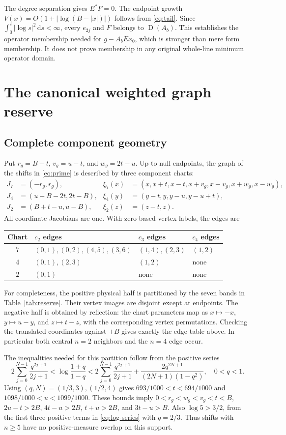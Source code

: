 \documentclass[11pt,a4paper]{article}
\newcommand{\Dom}{\operatorname{D}}
\theoremstyle{remark}
\numberwithin{equation}{section}
\begin{document}
The degree separation gives $E^*F=0$. The endpoint growth
$V(x)=O(1+|\log(B-|x|)|)$ follows from \eqref{eq:tail}. Since
$\int_0^\varepsilon|\log s|^2\,\mathrm ds<\infty$, every $e_{2j}$ and
$F$ belongs to $\Dom(A_b)$. This establishes the operator membership
needed for $g-A_bEx_0$, which is stronger than mere form membership.
It does not prove membership in any original whole-line minimum operator
domain.

\section{The canonical weighted graph reserve}\label{sec:reserve}
\subsection{Complete component geometry}
Put $r_g=B-t$, $v_g=u-t$, and $w_g=2t-u$. Up to null endpoints, the graph
of the shifts in \eqref{eq:prime} is described by three component charts:
\begin{align*}
 J_7&=(-r_g,r_g),&
 \xi_7(x)&=(x,x+t,x-t,x+v_g,x-v_g,x+w_g,x-w_g),\\
 J_4&=(u+B-2t,2t-B),&
 \xi_4(y)&=(y-t,y,y-u,y-u+t),\\
 J_2&=(B+t-u,u-B),&
 \xi_2(z)&=(z-t,z).
\end{align*}
All coordinate Jacobians are one. With zero-based vertex labels, the edges
are
\begin{center}
\small
\begin{tabular}{clll}
\toprule
Chart&$c_2$ edges&$c_3$ edges&$c_4$ edges\\
\midrule
$7$&$(0,1),(0,2),(4,5),(3,6)$&$(1,4),(2,3)$&$(1,2)$\\
$4$&$(0,1),(2,3)$&$(1,2)$&none\\
$2$&$(0,1)$&none&none\\
\bottomrule
\end{tabular}
\end{center}

For completeness, the positive physical half is partitioned by the seven
bands in Table~\ref{tab:reserve}. Their vertex images are disjoint except
at endpoints. The negative half is obtained by reflection: the chart
parameters map as $x\mapsto-x$, $y\mapsto u-y$, and $z\mapsto t-z$, with
the corresponding vertex permutations. Checking the translated coordinates
against $\pm B$ gives exactly the edge table above. In particular both
central $n=2$ neighbors and the $n=4$ edge occur.

The inequalities needed for this partition follow from the positive series
\begin{equation}\label{eq:log-series}
 2\sum_{j=0}^{N-1}\frac{q^{2j+1}}{2j+1}
 <\log\frac{1+q}{1-q}
 <2\sum_{j=0}^{N-1}\frac{q^{2j+1}}{2j+1}
       +\frac{2q^{2N+1}}{(2N+1)(1-q^2)},\quad0<q<1.
\end{equation}
Using $(q,N)=(1/3,3),(1/2,4)$ gives
$693/1000<t<694/1000$ and $1098/1000<u<1099/1000$.
These bounds imply $0<r_g<w_g<v_g<t<B$,
$2u-t>2B$, $4t-u>2B$, $t+u>2B$, and $3t-u>B$.
Also $\log5>3/2$, from the first three positive terms in
\eqref{eq:log-series} with $q=2/3$. Thus shifts with $n\ge5$ have no
positive-measure overlap on this support.
\end{document}
